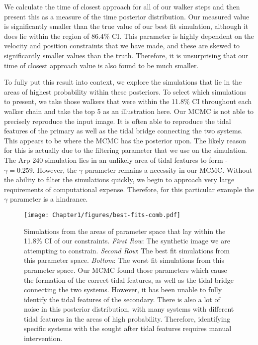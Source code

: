 We calculate the time of closest approach for all of our walker steps and then present this as a measure of the time posterior distribution. Our measured value is significantly smaller than the true value of our best fit simulation, although it does lie within the region of 86.4\% CI. This parameter is highly dependent on the velocity and position constraints that we have made, and these are skewed to significantly smaller values than the truth. Therefore, it is unsurprising that our time of closest approach value is also found to be much smaller.

To fully put this result into context, we explore the simulations that lie in the areas of highest probability within these posteriors. To select which simulations to present, we take those walkers that were within the 11.8\% CI throughout each walker chain and take the top 5 as an illustration here. Our MCMC is not able to precisely reproduce the input image. It is often able to reproduce the tidal features of the primary as well as the tidal bridge connecting the two systems. This appears to be where the MCMC has \DIFdelbegin {}\DIFdelend \DIFaddbegin {}\DIFaddend the posterior upon. The likely reason for this is actually due to the filtering parameter that we use on the simulation. The Arp 240 simulation lies in an unlikely area of tidal features to form - $\gamma = 0.259$\DIFdelbegin {}\DIFdelend \DIFaddbegin {}\DIFaddend . However, the $\gamma$ parameter remains a necessity in our MCMC. Without the ability to filter the simulations quickly, we begin to approach very large requirements of computational expense. Therefore, for this particular example the $\gamma$ parameter is a hindrance.

\begin{figure*}
\centering
\texttt{[image: Chapter1/figures/best-fits-comb.pdf]}
\caption[Simulations from the areas of parameter space that lay within the 11.8\% CI of our constraints.]{Simulations from the areas of parameter space that lay within the 11.8\% CI of our constraints. \textit{First Row}: The synthetic image we are attempting to constrain. \textit{Second Row}: The best fit simulations from this parameter space. \textit{Bottom}: The worst fit simulations from this parameter space. Our MCMC found those parameters which cause the formation of the correct tidal features, as well as the tidal bridge connecting the two systems. However, it has been unable to fully identify the tidal features of the secondary. There is also a lot of noise in this posterior distribution, with many systems with different tidal features in the areas of high probability. Therefore, identifying specific systems with the sought after tidal features requires manual intervention.}
\label{fig:arp240_corner_plot}
\end{figure*}

